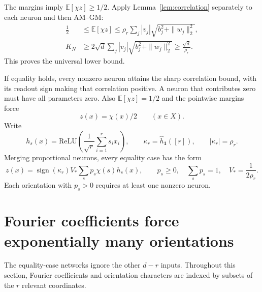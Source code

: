 \documentclass[11pt]{article}
\newcommand{\E}{\mathbb E}
\newcommand{\relu}{\mathrm{ReLU}}
\begin{document}
The margins imply $\E[\chi z]\ge1/2$. Apply
Lemma~\ref{lem:correlation} separately to each neuron and then AM--GM:
\begin{align}\label{eq:lower}
 \frac12&\le\E[\chi z]
 \le\rho_r\sum_j|v_j|\sqrt{b_j^2+\|w_j\|_2^2},\\
 K_N&\ge2\sqrt d\sum_j|v_j|\sqrt{b_j^2+\|w_j\|_2^2}
 \ge\frac{\sqrt d}{\rho_r}.\nonumber
\end{align}
This proves the universal lower bound.

If equality holds, every nonzero neuron attains the sharp correlation
bound, with its readout sign making that correlation positive. A neuron
that contributes zero must have all parameters zero. Also
$\E[\chi z]=1/2$ and the pointwise margins force
\begin{equation}\label{eq:exact-output}
 z(x)=\chi(x)/2\qquad(x\in X).
\end{equation}
Write
\[
 h_s(x)=\relu\left(\frac1{\sqrt r}\sum_{i=1}^rs_ix_i\right),
 \qquad \kappa_r=\widehat h_{\boldsymbol1}([r]),\qquad
 |\kappa_r|=\rho_r.
\]
Merging proportional neurons, every equality case has the form
\begin{equation}\label{eq:measure}
 z(x)=\operatorname{sign}(\kappa_r)V_*
       \sum_s p_s\chi(s)h_s(x),
 \qquad p_s\ge0,\quad\sum_sp_s=1,\quad
 V_* =\frac1{2\rho_r}.
\end{equation}
Each orientation with $p_s>0$ requires at least one nonzero neuron.

\section{Fourier coefficients force exponentially many orientations}

The equality-case networks ignore the other $d-r$ inputs. Throughout
this section, Fourier coefficients and orientation characters are indexed
by subsets of the $r$ relevant coordinates.
\end{document}
